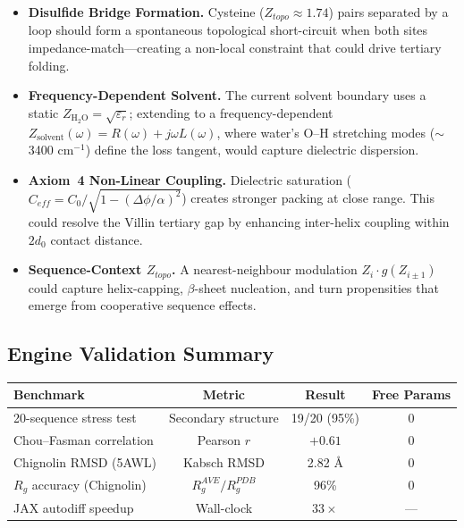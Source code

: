 \begin{itemize}
    \item \textbf{Disulfide Bridge Formation.} Cysteine ($Z_{topo} \approx 1.74$) pairs separated by a loop should form a spontaneous topological short-circuit when both sites impedance-match---creating a non-local constraint that could drive tertiary folding.
    \item \textbf{Frequency-Dependent Solvent.} The current solvent boundary uses a static $Z_{\text{H}_2\text{O}} = \sqrt{\varepsilon_r}$; extending to a frequency-dependent $Z_{\text{solvent}}(\omega) = R(\omega) + j\omega L(\omega)$, where water's O--H stretching modes ($\sim$3400 cm$^{-1}$) define the loss tangent, would capture dielectric dispersion.
    \item \textbf{Axiom~4 Non-Linear Coupling.} Dielectric saturation ($C_{eff} = C_0/\sqrt{1-(\Delta\phi/\alpha)^2}$) creates stronger packing at close range. This could resolve the Villin tertiary gap by enhancing inter-helix coupling within $2d_0$ contact distance.
    \item \textbf{Sequence-Context $Z_{topo}$.} A nearest-neighbour modulation $Z_i \cdot g(Z_{i\pm1})$ could capture helix-capping, $\beta$-sheet nucleation, and turn propensities that emerge from cooperative sequence effects.
\end{itemize}

\subsection*{Engine Validation Summary}
\begin{center}
\small
\renewcommand{\arraystretch}{1.2}
\begin{tabular}{lccc}
\toprule
\textbf{Benchmark} & \textbf{Metric} & \textbf{Result} & \textbf{Free Params} \\
\midrule
20-sequence stress test & Secondary structure & 19/20 (95\%) & 0 \\
Chou--Fasman correlation & Pearson $r$ & $+0.61$ & 0 \\
Chignolin RMSD (5AWL)  & Kabsch RMSD & 2.82 \AA & 0 \\
$R_g$ accuracy (Chignolin) & $R_g^{AVE}/R_g^{PDB}$ & 96\% & 0 \\
JAX autodiff speedup   & Wall-clock & $33\times$ & --- \\
\bottomrule
\end{tabular}
\end{center}
